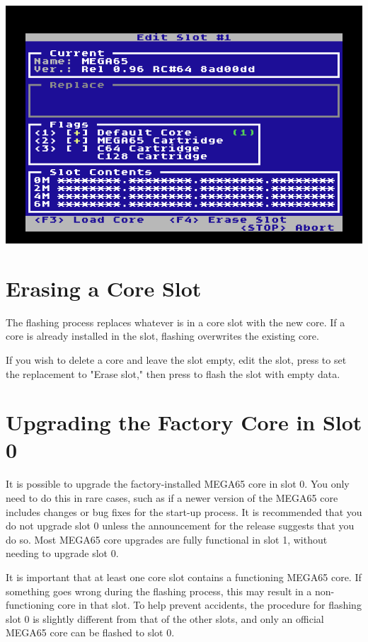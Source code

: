 \begin{center}
  \includegraphics[width=0.7\linewidth]{images/ss-flashmenu-flags.png}
\end{center}

\section{Erasing a Core Slot}

The flashing process replaces whatever is in a core slot with the new core. If a core is already installed in the slot, flashing overwrites the existing core.

If you wish to delete a core and leave the slot empty, edit the slot, press  to set the replacement to "Erase slot," then press  to flash the slot with empty data.

\section{Upgrading the Factory Core in Slot 0}

It is possible to upgrade the factory-installed MEGA65 core in slot 0. You only need to do this in rare cases, such as if a newer version of the MEGA65 core includes changes or bug fixes for the start-up process. It is recommended that you do not upgrade slot 0 unless the announcement for the release suggests that you do so. Most MEGA65 core upgrades are fully functional in slot 1, without needing to upgrade slot 0.

It is important that at least one core slot contains a functioning MEGA65 core. If something goes wrong during the flashing process, this may result in a non-functioning core in that slot. To help prevent accidents, the procedure for flashing slot 0 is slightly different from that of the other slots, and only an official MEGA65 core can be flashed to slot 0.

